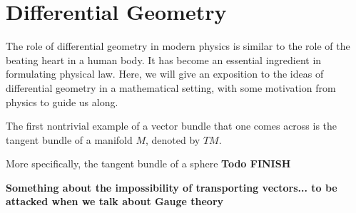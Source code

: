 	
	
	\section{Differential Geometry} %
	\label{sec:differential_geometry}
	
	The role of differential geometry in modern physics is similar to the role of the beating heart in a human body. It has become an essential ingredient in formulating physical law. Here, we will give an exposition to the ideas of differential geometry in a mathematical setting, with some motivation from physics to guide us along.
	
	\begin{defn}[Manifold]
		
	\end{defn}
	
	\begin{defn}
		
	\end{defn}
	
	\begin{defn}
		
	\end{defn}
	
	\begin{defn}[Section]
		
	\end{defn}
	
	\begin{eg}
		
	\end{eg}
	
	\begin{eg}
		The first nontrivial example of a vector bundle that one comes across is the tangent bundle of a manifold $M$, denoted by $TM$.
		
		More specifically, the tangent bundle of a sphere \textbf{Todo FINISH}
	\end{eg}
	
	\begin{obs}
		
	\end{obs}
	
	\textbf{Something about the impossibility of transporting vectors... to be attacked when we talk about Gauge theory}
	
	\begin{defn}
		
	\end{defn}
	
